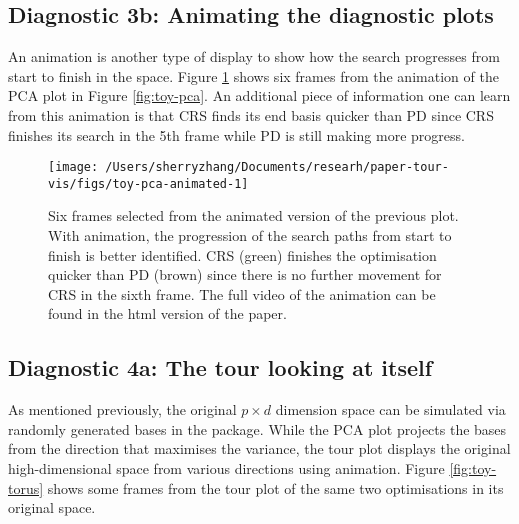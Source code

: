 \hypertarget{diagnostic-3b-animating-the-diagnostic-plots}{%
\subsection{Diagnostic 3b: Animating the diagnostic
plots}\label{diagnostic-3b-animating-the-diagnostic-plots}}

An animation is another type of display to show how the search
progresses from start to finish in the space. Figure
\ref{fig:toy-pca-animated} shows six frames from the animation of the
PCA plot in Figure \ref{fig:toy-pca}. An additional piece of information
one can learn from this animation is that CRS finds its end basis
quicker than PD since CRS finishes its search in the 5th frame while PD
is still making more progress.

\begin{Schunk}
\begin{figure}

{\centering \texttt{[image: /Users/sherryzhang/Documents/researh/paper-tour-vis/figs/toy-pca-animated-1]} 

}

\caption[Six frames selected from the animated version of the previous plot]{Six frames selected from the animated version of the previous plot. With animation, the progression of the search paths from start to finish is better identified. CRS (green) finishes the optimisation quicker than PD (brown) since there is no further movement for CRS in the sixth frame. The full video of the animation can be found in the html version of the paper.}\label{fig:toy-pca-animated}
\end{figure}
\end{Schunk}

\hypertarget{diagnostic-4a-the-tour-looking-at-itself}{%
\subsection{Diagnostic 4a: The tour looking at
itself}\label{diagnostic-4a-the-tour-looking-at-itself}}

As mentioned previously, the original \(p \times d\) dimension space can
be simulated via randomly generated bases in the 
\citep{geozoo} package. While the PCA plot projects the bases from the
direction that maximises the variance, the tour plot displays the
original high-dimensional space from various directions using animation.
Figure \ref{fig:toy-torus} shows some frames from the tour plot of the
same two optimisations in its original space.

